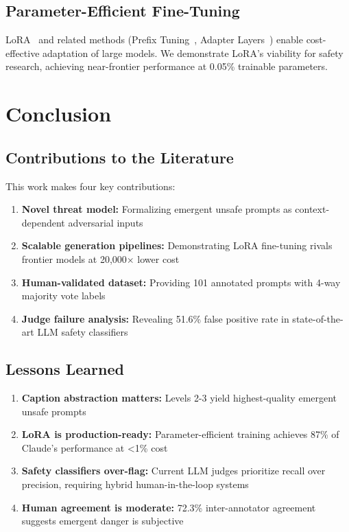 \documentclass[10pt,twocolumn,letterpaper]{article}
\begin{document}
\subsection{Parameter-Efficient Fine-Tuning}
LoRA~\cite{hu2021lora} and related methods (Prefix Tuning~\cite{li2021prefix}, Adapter Layers~\cite{houlsby2019parameter}) enable cost-effective adaptation of large models. We demonstrate LoRA's viability for safety research, achieving near-frontier performance at 0.05\% trainable parameters.

\section{Conclusion}

\subsection{Contributions to the Literature}
This work makes four key contributions:
\begin{enumerate}
    \item \textbf{Novel threat model:} Formalizing emergent unsafe prompts as context-dependent adversarial inputs
    \item \textbf{Scalable generation pipelines:} Demonstrating LoRA fine-tuning rivals frontier models at 20,000$\times$ lower cost
    \item \textbf{Human-validated dataset:} Providing 101 annotated prompts with 4-way majority vote labels
    \item \textbf{Judge failure analysis:} Revealing 51.6\% false positive rate in state-of-the-art LLM safety classifiers
\end{enumerate}

\subsection{Lessons Learned}
\begin{enumerate}
    \item \textbf{Caption abstraction matters:} Levels 2-3 yield highest-quality emergent unsafe prompts
    \item \textbf{LoRA is production-ready:} Parameter-efficient training achieves 87\% of Claude's performance at <1\% cost
    \item \textbf{Safety classifiers over-flag:} Current LLM judges prioritize recall over precision, requiring hybrid human-in-the-loop systems
    \item \textbf{Human agreement is moderate:} 72.3\% inter-annotator agreement suggests emergent danger is subjective
\end{enumerate}
\end{document}
